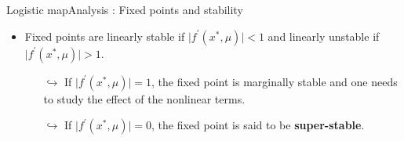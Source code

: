 \documentclass[usenames,dvipsnames,svgnames,10pt,aspectratio=169]{beamer}
\begin{document}
\begin{frame}[t, c]{Logistic map}{Analysis : Fixed points and stability}
	\begin{minipage}{.68\textwidth}
		\begin{itemize}
			\item Fixed points are linearly stable if \( \vert f^{\prime}\left( x^*, \mu \right) \vert < 1 \) and linearly unstable if \( \vert f^{\prime}\left( x^*, \mu \right) \vert > 1 \).
			\begin{itemize}
				\item[\( \hookrightarrow \)] If \( \vert f^{\prime}\left( x^*, \mu \right) \vert = 1 \), the fixed point is marginally stable and one needs to study the effect of the nonlinear terms.
				\item[\( \hookrightarrow \)] If \( \vert f^{\prime}\left( x^*, \mu \right) \vert = 0 \), the fixed point is said to be \textbf{super-stable}.
			\end{itemize}

			\medskip


\end{itemize}
\end{minipage}
\end{frame}
\end{document}
